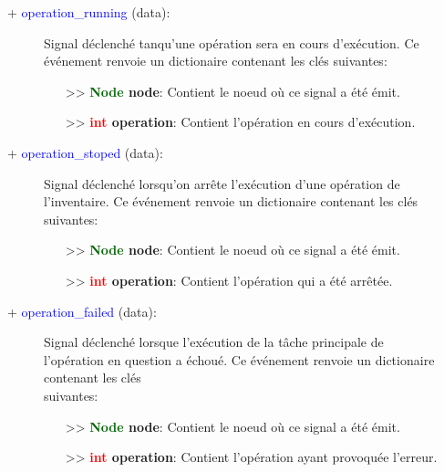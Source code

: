 \documentclass[a4paper, 11pt]{article}
\begin{document}
	\begin{description}
		\item [+ \textcolor{blue}{operation\_running} (data):] Signal déclenché tanqu'une opération sera en 
		cours d'exécution. Ce événement renvoie un dictionaire contenant les clés suivantes:
		\begin{itemize}
			\item [>> \textbf{\textcolor{darkgreen}{Node} node}:] Contient le noeud où ce signal a été émit.
			\item [>> \textbf{\textcolor{red}{int} operation}:] Contient l'opération en cours d'exécution.\\
		\end{itemize}
	\end{description}
	\begin{description}
		\item [+ \textcolor{blue}{operation\_stoped} (data):] Signal déclenché lorsqu'on arrête l'exécution 
		d'une opération de \\l'inventaire. Ce événement renvoie un dictionaire contenant les clés suivantes:
		\begin{itemize}
			\item [>> \textbf{\textcolor{darkgreen}{Node} node}:] Contient le noeud où ce signal a été émit.
			\item [>> \textbf{\textcolor{red}{int} operation}:] Contient l'opération qui a été arrêtée.\\
		\end{itemize}
	\end{description}
	\begin{description}
		\item [+ \textcolor{blue}{operation\_failed} (data):] Signal déclenché lorsque l'exécution de la 
		tâche principale de \\l'opération en question a échoué. Ce événement renvoie un dictionaire 
		contenant les clés \\suivantes:
		\begin{itemize}
			\item [>> \textbf{\textcolor{darkgreen}{Node} node}:] Contient le noeud où ce signal a été émit.
			\item [>> \textbf{\textcolor{red}{int} operation}:] Contient l'opération ayant provoquée 
			l'erreur.\\
		\end{itemize}
	\end{description}
\end{document}
